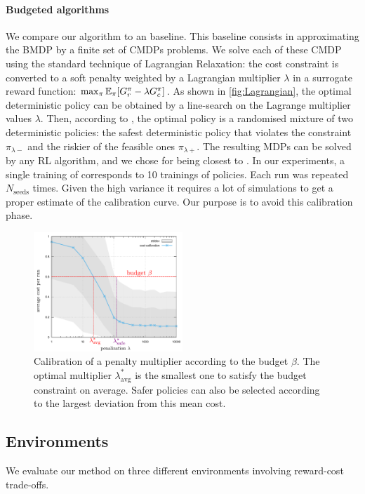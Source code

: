 \paragraph{Budgeted algorithms}\label{par:ex-brl} We compare our \BFTQ algorithm to an \FTQl baseline. This baseline consists in approximating the BMDP by a finite set of CMDPs problems. We solve each of these CMDP using the standard technique of Lagrangian Relaxation: the cost constraint is converted to a soft penalty weighted by a Lagrangian multiplier $\lambda$ in a surrogate reward function: $\max_{\pi} \operatorname*{\mathbb{E}}_{\pi}[G_r^\pi - \lambda G_c^\pi]$.
As shown in \autoref{fig:Lagrangian}, the optimal deterministic policy can be obtained by a line-search on the Lagrange multiplier values $\lambda$.
Then, according to \citet[Theorem 4.4]{BEUTLER1985236}, the optimal policy is a randomised mixture of two deterministic policies: the safest deterministic policy that violates the constraint $\pi_{\lambda-}$ and the riskier of the feasible ones $\pi_{\lambda+}$.
The resulting MDPs can be solved by any RL algorithm, and we chose \FTQ for being closest to \BFTQ.
In our experiments, a single training of \BFTQ corresponds to 10 trainings of \FTQl policies. Each run was repeated $N_{\text{seeds}}$ times. Given the high variance it requires a lot of simulations to get a proper estimate of the calibration curve. Our purpose is to avoid this calibration phase.

\begin{figure}[tp]
	\centering
	\includegraphics[width=0.5\textwidth]{img/CalibrationExample}
	\caption{Calibration of a penalty multiplier according to the budget $\beta$. The optimal multiplier $\lambda^*_{\text{avg}}$ is the smallest one to satisfy the budget constraint on average. Safer policies can also be selected according to the largest deviation from this mean cost.}
	\label{fig:Lagrangian}
\end{figure}


\subsection{Environments}
\label{subsec:environments}
We evaluate our method on three different environments involving reward-cost trade-offs. %

